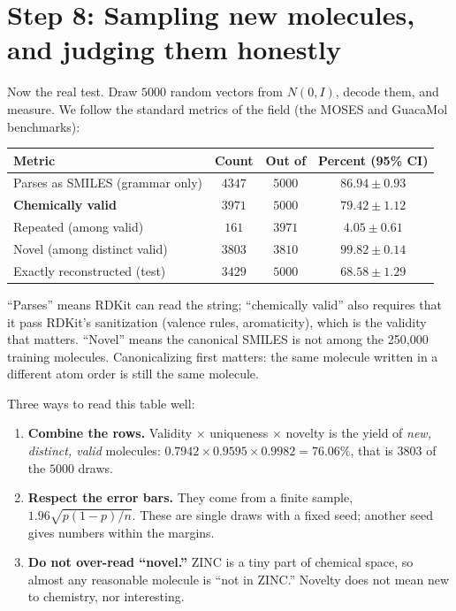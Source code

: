 \documentclass[11pt]{article}
\begin{document}
\section{Step 8: Sampling new molecules, and judging them honestly}
Now the real test. Draw $5000$ random vectors from $N(0,I)$, decode them, and measure. We follow the standard metrics of the field (the MOSES and GuacaMol benchmarks):

\begin{center}
\small
\begin{tabular}{@{}lccc@{}}
\toprule
Metric & Count & Out of & Percent (95\% CI)\\
\midrule
Parses as SMILES (grammar only) & $4347$ & $5000$ & $86.94\pm0.93$\\
\textbf{Chemically valid} & $3971$ & $5000$ & $\mathbf{79.42}\pm1.12$\\
Repeated (among valid) & $161$ & $3971$ & $4.05\pm0.61$\\
Novel (among distinct valid) & $3803$ & $3810$ & $99.82\pm0.14$\\
Exactly reconstructed (test) & $3429$ & $5000$ & $68.58\pm1.29$\\
\bottomrule
\end{tabular}
\end{center}

``Parses'' means RDKit can read the string; ``chemically valid'' also requires that it pass RDKit's sanitization (valence rules, aromaticity), which is the validity that matters. ``Novel'' means the canonical SMILES is not among the 250{,}000 training molecules. Canonicalizing first matters: the same molecule written in a different atom order is still the same molecule.

Three ways to read this table well:
\begin{enumerate}[nosep]
  \item \textbf{Combine the rows.} Validity $\times$ uniqueness $\times$ novelty is the yield of \emph{new, distinct, valid} molecules: $0.7942\times0.9595\times0.9982=76.06\%$, that is $3803$ of the $5000$ draws.
  \item \textbf{Respect the error bars.} They come from a finite sample, $1.96\sqrt{p(1-p)/n}$. These are single draws with a fixed seed; another seed gives numbers within the margins.
  \item \textbf{Do not over-read ``novel.''} ZINC is a tiny part of chemical space, so almost any reasonable molecule is ``not in ZINC.'' Novelty does not mean new to chemistry, nor interesting.
\end{enumerate}
\end{document}
